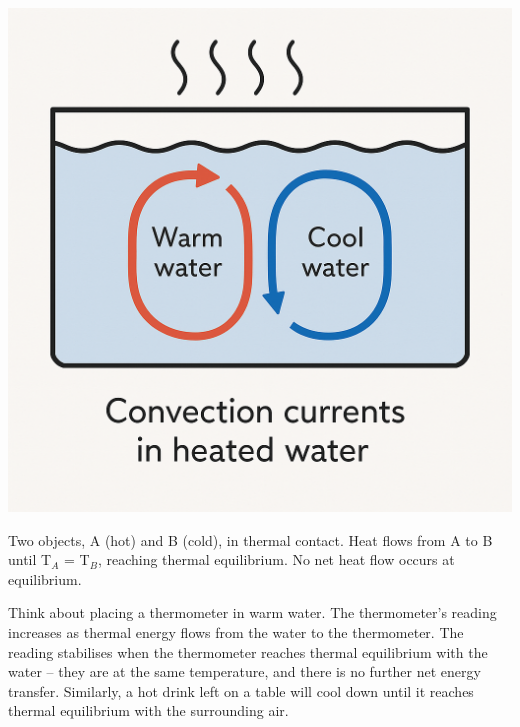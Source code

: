 
\begin{marginfigure}[0pt]
\includegraphics[width=\linewidth]{convection_currents.png} %
\caption{Two objects, A (hot) and B (cold), in thermal contact. Heat flows from A to B until T\(_A\) = T\(_B\), reaching thermal equilibrium. No net heat flow occurs at equilibrium.}
\label{fig:thermal_equilibrium}
\end{marginfigure}

Think about placing a thermometer in warm water. The thermometer's reading increases as thermal energy flows from the water to the thermometer. The reading stabilises when the thermometer reaches thermal equilibrium with the water – they are at the same temperature, and there is no further net energy transfer. Similarly, a hot drink left on a table will cool down until it reaches thermal equilibrium with the surrounding air.

